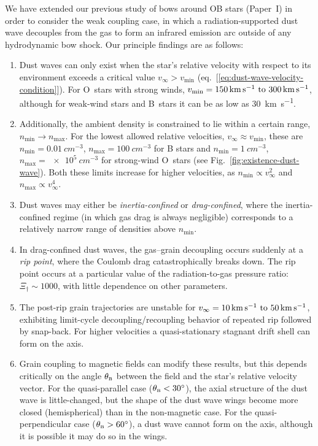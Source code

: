 We have extended our previous study of bows around OB stars (Paper~I)
in order to consider the weak coupling case, in which a
radiation-supported dust wave decouples from the gas to form an
infrared emission arc outside of any hydrodynamic bow shock.  Our
principle findings are as follows:
\begin{enumerate}[1.]
\item Dust waves can only exist when the star's relative velocity with
  respect to its environment exceeds a critical value
  \(v_\infty > v_{\text{min}}\)
  (eq.~[\ref{eq:dust-wave-velocity-condition}]).  For O~stars with
  strong winds,
  \(v_{\text{min}} = \text{\SIrange{150}{300}{km.s^{-1}}}\), although
  for weak-wind stars and B~stars it can be as low as
  \SI{30}{km.s^{-1}}.
\item Additionally, the ambient density is constrained to lie within a
  certain range, \(n_{\text{min}} \to n_{\text{max}}\). For the lowest
  allowed relative velocities, \(v_\infty \approx v_{\text{min}}\), these are
  \(n_{\text{min}} = \SI{0.01}{cm^{-3}}\),
  \(n_{\text{max}} = \SI{100}{cm^{-3}}\) for B stars and
  \(n_{\text{min}} = \SI{1}{cm^{-3}}\),
  \(n_{\text{max}} = \SI{e5}{cm^{-3}}\) for strong-wind O~stars (see
  Fig.~\ref{fig:existence-dust-wave}).  Both these limits increase for
  higher velocities, as \(n_{\text{min}} \propto v_\infty^2\) and
  \(n_{\text{max}} \propto v_\infty^4\).
\item Dust waves may either be \textit{inertia-confined} or
  \textit{drag-confined}, where the inertia-confined regime (in which
  gas drag is always negligible) corresponds to a relatively narrow
  range of densities above \(n_{\text{min}}\).
\item In drag-confined dust waves, the gas--grain decoupling occurs
  suddenly at a \textit{rip point}, where the Coulomb drag
  catastrophically breaks down. The rip point occurs at a particular
  value of the radiation-to-gas pressure ratio:
  \(\Xi_\dag \sim 1000\), with little dependence on other parameters.
\item The post-rip grain trajectories are unstable for
  \(v_\infty = \text{\SIrange{10}{50}{km.s^{-1}}}\), exhibiting limit-cycle
  decoupling/recoupling behavior of repeated rip followed by
  snap-back.  For higher velocities a quasi-stationary stagnant drift
  shell can form on the axis.
\item Grain coupling to magnetic fields can modify these results, but
  this depends critically on the angle \(\theta_{\scriptscriptstyle\text{B}}\) between the field and
  the star's relative velocity vector.  For the quasi-parallel case
  (\(\theta_{\scriptscriptstyle\text{B}} < \ang{30}\)), the axial structure of the dust wave is
  little-changed, but the shape of the dust wave wings become more
  closed (hemispherical) than in the non-magnetic case.  For the
  quasi-perpendicular case (\(\theta_{\scriptscriptstyle\text{B}} > \ang{60}\)), a dust wave cannot form
  on the axis, although it is possible it may do so in the wings.
\end{enumerate}


